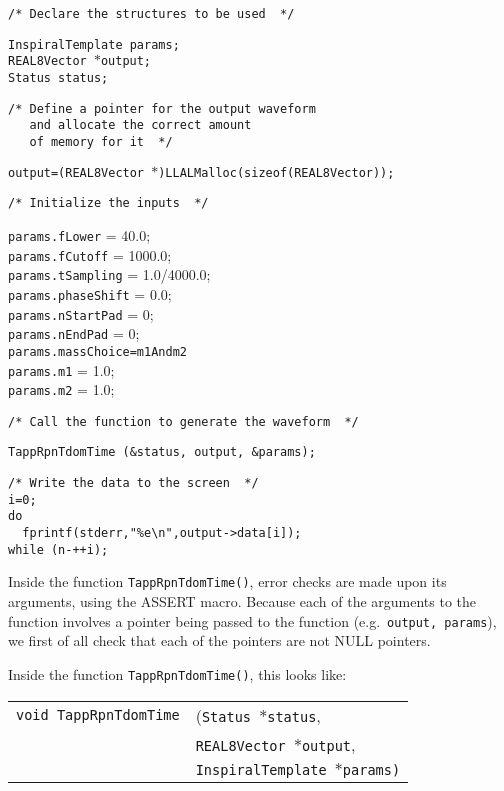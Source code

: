 \documentclass[12pt]{article}
\begin{document}
\noindent
\begin{verbatim}
/* Declare the structures to be used  */
\end{verbatim}
\texttt{InspiralTemplate params;} \\
\texttt{REAL8Vector $\ast$output;} \\
\texttt{Status status;} \\
\begin{verbatim}
/* Define a pointer for the output waveform 
   and allocate the correct amount 
   of memory for it  */
\end{verbatim}
\texttt{output=(REAL8Vector $\ast$)LLALMalloc(sizeof(REAL8Vector));} \\
\begin{verbatim}
/* Initialize the inputs  */
\end{verbatim}
\texttt{params.fLower} = 40.0;\\
\texttt{params.fCutoff} = 1000.0; \\
\texttt{params.tSampling} = 1.0/4000.0; \\
\texttt{params.phaseShift} = 0.0; \\
\texttt{params.nStartPad} = 0; \\
\texttt{params.nEndPad} = 0; \\
\texttt{params.massChoice=m1Andm2}\\
\texttt{params.m1} = 1.0; \\
\texttt{params.m2} = 1.0; \\
\begin{verbatim}
/* Call the function to generate the waveform  */
\end{verbatim}
\texttt{TappRpnTdomTime (\&status, output, \&params);}
\begin{verbatim}
/* Write the data to the screen  */
i=0; 
do 
  fprintf(stderr,"%e\n",output->data[i]); 
while (n-++i);
\end{verbatim}

Inside the function \texttt{TappRpnTdomTime()}, error checks are made upon its arguments, using the ASSERT macro. Because each of the arguments to the function involves a pointer being passed to the function (e.g.\ \texttt{output, params}), we first of all check that each of the pointers are not NULL pointers.

Inside the function \texttt{TappRpnTdomTime()}, this looks like:

\vspace{5mm}

\begin{tabular}{ll}
\texttt{void TappRpnTdomTime} & (\texttt{Status $\ast$status}, \\
                        & \texttt{REAL8Vector $\ast$output}, \\
                        & \texttt{InspiralTemplate $\ast$params)}
\end{tabular}
\end{document}
